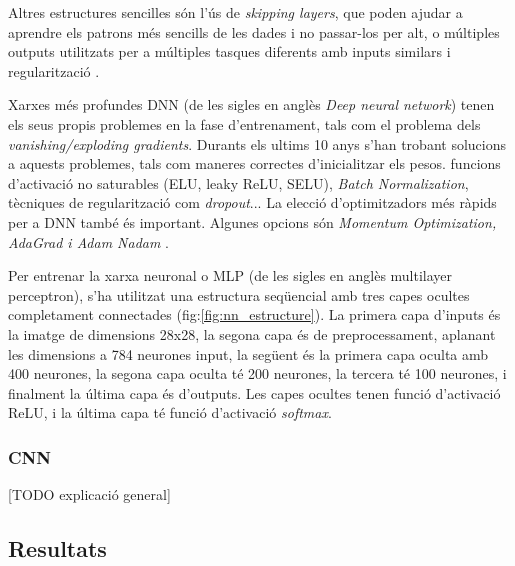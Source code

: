 \documentclass[12pt, spanish]{article}
\begin{document}
Altres estructures sencilles són l'ús de \textit{skipping layers}, que poden ajudar a aprendre els patrons més sencills de les dades i no passar-los per alt, o múltiples outputs utilitzats per a múltiples tasques diferents amb inputs similars i regularització \cite[Cap. 10]{geron2019hands}.

Xarxes més profundes DNN (de les sigles en anglès \textit{Deep neural network}) tenen els seus propis problemes en la fase d'entrenament, tals com el problema dels \textit{vanishing/exploding gradients}. Durants els ultims 10 anys s'han trobant solucions a aquests problemes, tals com maneres correctes d'inicialitzar els pesos. funcions d'activació no saturables (ELU, leaky ReLU, SELU), \textit{Batch Normalization}, tècniques de regularització com \textit{dropout}... La elecció d'optimitzadors més ràpids per a DNN també és important. Algunes opcions són \textit{Momentum Optimization, AdaGrad i Adam Nadam} \cite[Cap. 11]{geron2019hands}.

Per entrenar la xarxa neuronal o MLP (de les sigles en anglès multilayer perceptron), s'ha utilitzat una estructura seqüencial amb tres capes ocultes completament connectades (fig:\ref{fig:nn_estructure}). La primera capa d'inputs és la imatge de dimensions 28x28, la segona capa és de preprocessament, aplanant les dimensions a 784 neurones input, la següent és la primera capa oculta amb 400 neurones, la segona capa oculta té 200 neurones, la tercera té 100 neurones, i finalment la última capa és d'outputs. Les capes ocultes tenen funció d'activació ReLU, i la última capa té funció d'activació \textit{softmax}. 




\subsubsection{CNN}

[TODO explicació general]










\subsection{Resultats}
\end{document}
